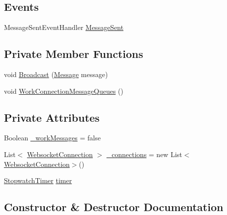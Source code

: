 \subsection*{Events}
\begin{DoxyCompactItemize}
\item 
Message\+Sent\+Event\+Handler \hyperlink{class_web_analyzer_1_1_server_1_1_connection_manager_a2eb5de18882e69a65b4b7ce3ee458af1}{Message\+Sent}
\end{DoxyCompactItemize}
\subsection*{Private Member Functions}
\begin{DoxyCompactItemize}
\item 
void \hyperlink{class_web_analyzer_1_1_server_1_1_connection_manager_a802503ffd29cf9a18a2bfae95adc4b4e}{Broadcast} (\hyperlink{class_web_analyzer_1_1_models_1_1_message_model_1_1_message}{Message} message)
\item 
void \hyperlink{class_web_analyzer_1_1_server_1_1_connection_manager_a773422b69490cf64139d8237a9122eaa}{Work\+Connection\+Message\+Queues} ()
\end{DoxyCompactItemize}
\subsection*{Private Attributes}
\begin{DoxyCompactItemize}
\item 
Boolean \hyperlink{class_web_analyzer_1_1_server_1_1_connection_manager_a23a1f3a046b14bcb1333c3ef846015d6}{\+\_\+work\+Messages} = false
\item 
List$<$ \hyperlink{class_web_analyzer_1_1_server_1_1_websocket_connection}{Websocket\+Connection} $>$ \hyperlink{class_web_analyzer_1_1_server_1_1_connection_manager_a4d1d80f0e1bca824c36908efcc4f9dc0}{\+\_\+connections} = new List$<$\hyperlink{class_web_analyzer_1_1_server_1_1_websocket_connection}{Websocket\+Connection}$>$()
\item 
\hyperlink{class_web_analyzer_1_1_util_1_1_stopwatch_timer}{Stopwatch\+Timer} \hyperlink{class_web_analyzer_1_1_server_1_1_connection_manager_aa639f32d7193a808bd9680359b325887}{timer}
\end{DoxyCompactItemize}


\subsection{Constructor \& Destructor Documentation}
\hypertarget{class_web_analyzer_1_1_server_1_1_connection_manager_ae034fe5148cccbcc759a56abd68bb51a}{}
